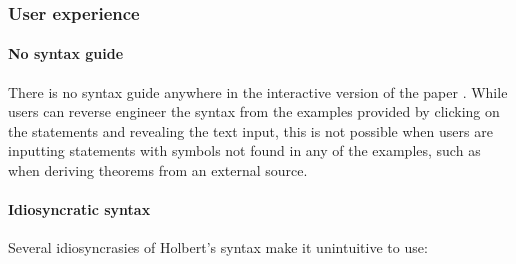 \subsubsection{User experience}
\paragraph{No syntax guide}
There is no syntax guide anywhere in the interactive version of the paper \cite{oconnor:2022-interactive}. While users can reverse engineer the syntax from the examples provided by clicking on the statements and revealing the text input, this is not possible when users are inputting statements with symbols not found in any of the examples, such as when deriving theorems from an external source.

\paragraph{Idiosyncratic syntax}
Several idiosyncrasies of Holbert's syntax make it unintuitive to use:
